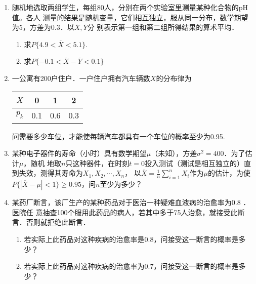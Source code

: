 \documentclass[10pt,a4paper]{article}
\begin{document}
\begin{enumerate}
    \item 随机地选取两组学生，每组80人，分别在两个实验室里测量某种化合物的pH值。各人
    测量的结果是随机变量，它们相互独立，服从同一分布，数学期望为5，方差为0.3．以$\overline{X},\overline{Y}$分
    别表示第一组和第二组所得结果的算术平均．
    \begin{enumerate}
        \item 求$P\{4.9<\overline{X}<5.1\}$.
        \item 求$P\{-0.1<\overline{X}-\overline{Y}<0.1\}$
    \end{enumerate}
    \vspace{10cm}



    \item 一公寓有200户住户．一户住户拥有汽车辆数$X$的分布律为
    \begin{table}[H]\centering
    \begin{tabular}{c|ccc}
    $X$   & 0 & 1   & 2   \\ \hline
    $p_k$ & 0.1  & 0.6 & 0.3
    \end{tabular}
    \end{table}
    \vspace{-0.5cm}
    问需要多少车位，才能使每辆汽车都具有一个车位的概率至少为0.95.
    \vspace{10cm}



    \item 某种电子器件的寿命（小时）具有数学期望$\mu$（未知），方差$\sigma^2=400$．为了估计$\mu$，随机
    地取$n$只这种器件，在时刻$t=0$投入测试（测试是相互独立的）直到失效，测得其寿命为$X_1,X_2,\cdots,X_n$，
    以$\displaystyle{\overline{X}=\frac{1}{n}\sum_{i=1}^n X_i}$作为$\mu$的估计，为使
    $P\{|\overline{X}-\mu|<1\}\geq 0.95$，问$n$至少为多少？
    \vspace{10cm}




    \item 某药厂断言，该厂生产的某种药品对于医治一种疑难血液病的治愈率为0.8 ．医院任
    意抽查100个服用此药品的病人，若其中多于75人治愈，就接受此断言．否则就拒绝此断言．
    \begin{enumerate}
        \item 若实际上此药品对这种疾病的治愈率是0.8，问接受这一断言的概率是多少？
        \item 若实际上此药品对这种疾病的治愈率为0.7，问接受这一断言的概率是多少？
    \end{enumerate}

    

    


  

\end{enumerate}
\end{document}
